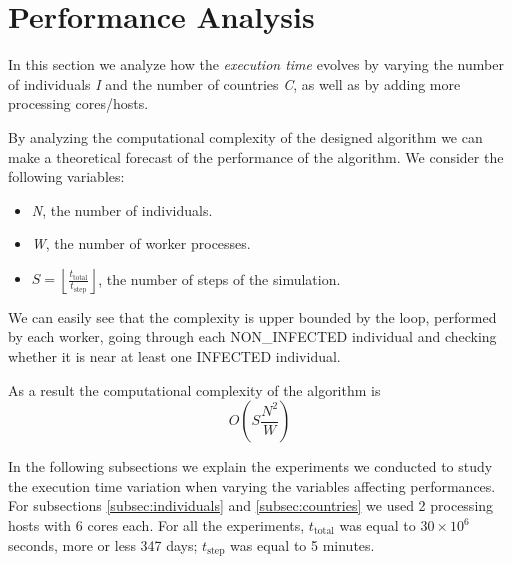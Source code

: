 \documentclass[11pt]{article}
\begin{document}
\section{Performance Analysis}
In this section we analyze how the \textit{execution time} evolves by varying the number of individuals \textit{I} and the number of countries \textit{C}, as well as by adding more processing cores/hosts.

By analyzing the computational complexity of the designed algorithm we can make a theoretical forecast of the performance of the algorithm. We consider the following variables: 
\begin{itemize}
    \item \textit{N}, the number of individuals.
    \item \textit{W}, the number of worker processes.
    \item \(S = \left\lfloor \frac{{t_{\text{{total}}}}}{{t_{\text{{step}}}}} \right\rfloor\), the number of steps of the simulation.
\end{itemize}
We can easily see that the complexity is upper bounded by the loop, performed by each worker, going through each NON\_INFECTED individual and checking whether it is near at least one INFECTED individual. 

As a result the computational complexity of the algorithm is \[O\left(S \frac{N^2}{W}\right)\]

In the following subsections we explain the experiments we conducted to study the execution time variation when varying the variables affecting performances. For subsections \ref{subsec:individuals} and \ref{subsec:countries} we used 2 processing hosts with 6 cores each. For all the experiments, \(t_{\text{total}}\) was equal to \(30 \times 10^6\) seconds, more or less 347 days; \(t_{\text{step}}\) was equal to 5 minutes.
\end{document}
